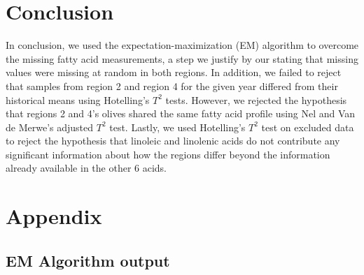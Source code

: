 \documentclass[11pt]{article}
\begin{document}
\section*{Conclusion}
\vspace{-4mm}
In conclusion, we used the expectation-maximization (EM) algorithm to overcome the missing fatty acid measurements, a step we justify by our stating that missing values were missing at random in both regions. In addition, we failed to reject that samples from region 2 and region 4 for the given year differed from their historical means using Hotelling's $T^2$ tests. However, we rejected the hypothesis that regions 2 and 4's olives shared the same fatty acid profile using Nel and Van de Merwe's adjusted $T^2$ test.  Lastly, we used Hotelling's $T^2$ test on excluded data to reject the hypothesis that linoleic and linolenic acids do not contribute any significant information about how the regions differ beyond the information already available in the other 6 acids.

\section*{Appendix}

\subsection*{EM Algorithm output}
\begingroup
    \fontsize{7pt}{6pt}\selectfont
    
\end{document}
